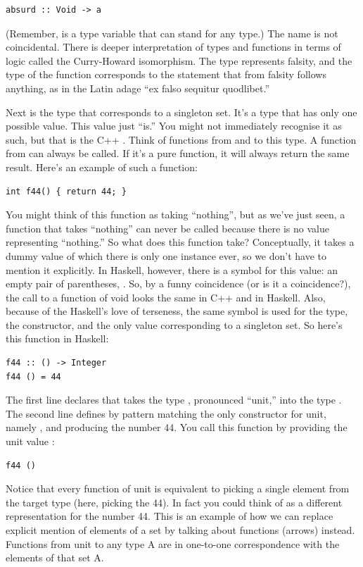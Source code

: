 \begin{verbatim}
absurd :: Void -> a
\end{verbatim}
(Remember,  is a type variable that can stand for any type.)
The name is not coincidental. There is deeper interpretation of types
and functions in terms of logic called the Curry-Howard isomorphism. The
type  represents falsity, and the type of the function
 corresponds to the statement that from falsity follows
anything, as in the Latin adage ``ex falso sequitur quodlibet.''

Next is the type that corresponds to a singleton set. It's a type that
has only one possible value. This value just ``is.'' You might not
immediately recognise it as such, but that is the C++ .
Think of functions from and to this type. A function from 
can always be called. If it's a pure function, it will always return the
same result. Here's an example of such a function:

\begin{verbatim}
int f44() { return 44; }
\end{verbatim}
You might think of this function as taking ``nothing'', but as we've
just seen, a function that takes ``nothing'' can never be called because
there is no value representing ``nothing.'' So what does this function
take? Conceptually, it takes a dummy value of which there is only one
instance ever, so we don't have to mention it explicitly. In Haskell,
however, there is a symbol for this value: an empty pair of parentheses,
\code{()}. So, by a funny coincidence (or is it a coincidence?), the
call to a function of void looks the same in C++ and in Haskell. Also,
because of the Haskell's love of terseness, the same symbol \code{()}
is used for the type, the constructor, and the only value corresponding
to a singleton set. So here's this function in Haskell:

\begin{verbatim}
f44 :: () -> Integer
f44 () = 44
\end{verbatim}
The first line declares that  takes the type \code{()},
pronounced ``unit,'' into the type . The second line
defines  by pattern matching the only constructor for unit,
namely \code{()}, and producing the number 44. You call this function
by providing the unit value \code{()}:

\begin{verbatim}
f44 ()
\end{verbatim}
Notice that every function of unit is equivalent to picking a single
element from the target type (here, picking the  44). In
fact you could think of  as a different representation for
the number 44. This is an example of how we can replace explicit mention
of elements of a set by talking about functions (arrows) instead.
Functions from unit to any type A are in one-to-one correspondence with
the elements of that set A.

